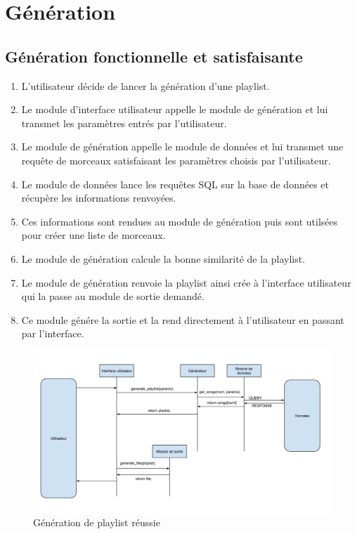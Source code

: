 \section{Génération}
\label{scenarii:gen}

\subsection{Génération fonctionnelle et satisfaisante}
\label{scenarii:gen:satis}

\begin{enumerate}
\item L'utilisateur décide de lancer la génération d'une playlist.
\item Le module d'interface utilisateur appelle le module de génération et 
lui transmet les paramètres entrés par l'utilisateur.
\item Le module de génération appelle le module de données et lui transmet 
une requête de morceaux satisfaisant les paramètres choisis par l'utilisateur.
\item Le module de données lance les requêtes SQL sur la base de données et
récupère les informations renvoyées.
\item Ces informations sont rendues au module de génération puis sont 
utilsées pour créer une liste de morceaux.
\item Le module de génération calcule la bonne similarité de la playlist.
\item Le module de génération renvoie la playlist ainsi crée à l'interface 
utilisateur qui la passe au module de sortie demandé.
\item Ce module génére la sortie et la rend directement à l'utilisateur en 
passant par l'interface.
\end{enumerate}

\begin{figure}[!h]
\includegraphics[width=14cm]{data/generation_fonctionnel.png}
\caption{Génération de playlist réussie}
\end{figure}

